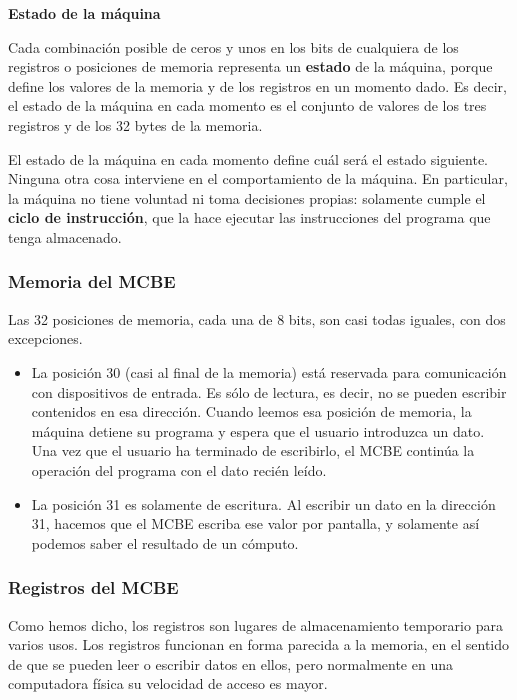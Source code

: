 \documentclass[spanish,A4,]{article}
\begin{document}
\textbf{Estado de la máquina}

Cada combinación posible de ceros y unos en los bits de cualquiera de
los registros o posiciones de memoria representa un \textbf{estado} de
la máquina, porque define los valores de la memoria y de los registros
en un momento dado. Es decir, el estado de la máquina en cada momento es
el conjunto de valores de los tres registros y de los 32 bytes de la
memoria.

El estado de la máquina en cada momento define cuál será el estado
siguiente. Ninguna otra cosa interviene en el comportamiento de la
máquina. En particular, la máquina no tiene voluntad ni toma decisiones
propias: solamente cumple el \textbf{ciclo de instrucción}, que la hace
ejecutar las instrucciones del programa que tenga almacenado.

\subsubsection{Memoria del MCBE}\label{memoria-del-mcbe}

Las 32 posiciones de memoria, cada una de 8 bits, son casi todas
iguales, con dos excepciones.

\begin{itemize}
\itemsep1pt\parskip0pt
\item
  La posición 30 (casi al final de la memoria) está reservada para
  comunicación con dispositivos de entrada. Es sólo de lectura, es
  decir, no se pueden escribir contenidos en esa dirección. Cuando
  leemos esa posición de memoria, la máquina detiene su programa y
  espera que el usuario introduzca un dato. Una vez que el usuario ha
  terminado de escribirlo, el MCBE continúa la operación del programa
  con el dato recién leído.
\item
  La posición 31 es solamente de escritura. Al escribir un dato en la
  dirección 31, hacemos que el MCBE escriba ese valor por pantalla, y
  solamente así podemos saber el resultado de un cómputo.
\end{itemize}

\subsubsection{Registros del MCBE}\label{registros-del-mcbe}

Como hemos dicho, los registros son lugares de almacenamiento temporario
para varios usos. Los registros funcionan en forma parecida a la
memoria, en el sentido de que se pueden leer o escribir datos en ellos,
pero normalmente en una computadora física su velocidad de acceso es
mayor.
\end{document}
